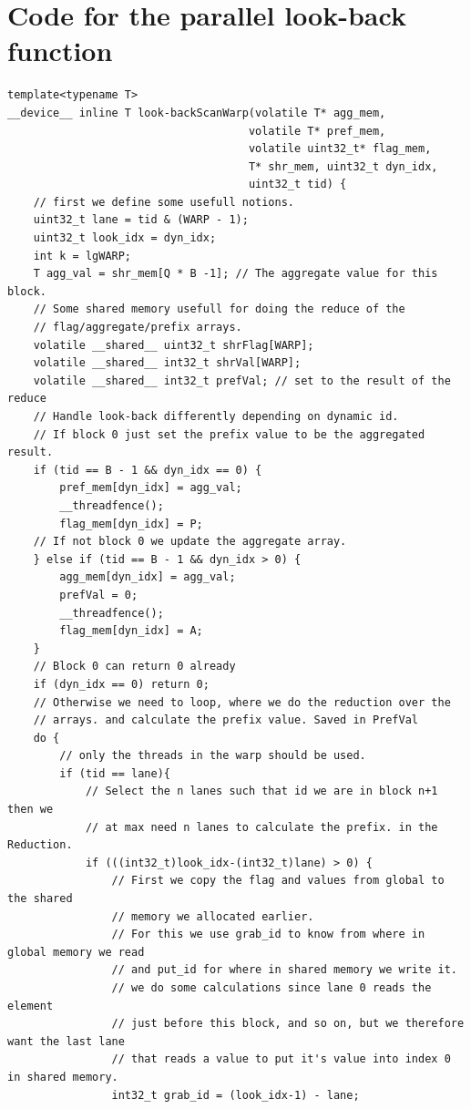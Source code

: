 \documentclass[twocolumn]{article}
\begin{document}
\section{Code for the parallel look-back function}
\begin{lstlisting}[caption=parallel look-back function,label=lst:parlook-backScan]
template<typename T>
__device__ inline T look-backScanWarp(volatile T* agg_mem,
								     volatile T* pref_mem,
								     volatile uint32_t* flag_mem,
								     T* shr_mem, uint32_t dyn_idx,
								     uint32_t tid) {
    // first we define some usefull notions.
    uint32_t lane = tid & (WARP - 1);
    uint32_t look_idx = dyn_idx;
    int k = lgWARP;
    T agg_val = shr_mem[Q * B -1]; // The aggregate value for this block.
    // Some shared memory usefull for doing the reduce of the
    // flag/aggregate/prefix arrays.
    volatile __shared__ uint32_t shrFlag[WARP];
    volatile __shared__ int32_t shrVal[WARP];
    volatile __shared__ int32_t prefVal; // set to the result of the reduce
	// Handle look-back differently depending on dynamic id.
    // If block 0 just set the prefix value to be the aggregated result.
    if (tid == B - 1 && dyn_idx == 0) {
		pref_mem[dyn_idx] = agg_val;
        __threadfence();
        flag_mem[dyn_idx] = P;
    // If not block 0 we update the aggregate array.
    } else if (tid == B - 1 && dyn_idx > 0) {
        agg_mem[dyn_idx] = agg_val;
        prefVal = 0;
        __threadfence();
        flag_mem[dyn_idx] = A;
    }
    // Block 0 can return 0 already
    if (dyn_idx == 0) return 0;
    // Otherwise we need to loop, where we do the reduction over the
    // arrays. and calculate the prefix value. Saved in PrefVal
    do {
        // only the threads in the warp should be used.
        if (tid == lane){
            // Select the n lanes such that id we are in block n+1 then we
            // at max need n lanes to calculate the prefix. in the Reduction.
            if (((int32_t)look_idx-(int32_t)lane) > 0) {
                // First we copy the flag and values from global to the shared
                // memory we allocated earlier.
                // For this we use grab_id to know from where in global memory we read
                // and put_id for where in shared memory we write it.
                // we do some calculations since lane 0 reads the element
                // just before this block, and so on, but we therefore want the last lane
                // that reads a value to put it's value into index 0 in shared memory.
                int32_t grab_id = (look_idx-1) - lane;

\end{lstlisting}
\end{document}
